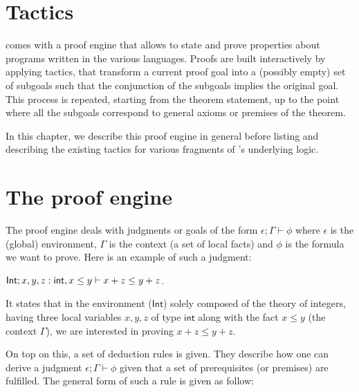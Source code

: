 \section{Tactics}

\EasyCrypt comes with a proof engine that allows to state and prove properties
about programs written in the various languages.
%
Proofs are built interactively by applying tactics, that transform a
current proof goal into a (possibly empty) set of subgoals such that the
conjunction of the subgoals implies the original goal.
%
This process is repeated, starting from the theorem statement, up to the point
where all the subgoals correspond to general axioms or premises of the theorem.

In this chapter, we describe this proof engine in general before listing and
describing the existing tactics for various fragments of \EasyCrypt's
underlying logic.

\section{The proof engine}

The proof engine deals with judgments or goals of the form
$\epsilon; \Gamma \vdash \phi$ where $\epsilon$ is the (global) environment,
$\Gamma$ is the context (a set of local facts) and $\phi$ is the
formula we want to prove. Here is an example of such a judgment:

\begin{center}
$\mathsf{Int}; x, y , z: \tint, x \le y \vdash x + z \le y + z$.
\end{center}

It states that in the environment ($\mathsf{Int}$) solely composed of the
theory of integers, having three local variables $x, y, z$ of type
$\mathsf{int}$ along with the fact $x \le y$ (the context $\Gamma$), we are
interested in proving $x + z \le y + z$.

\medskip

On top on this, a set of deduction rules is given. They describe how one can
derive a judgment $\epsilon; \Gamma \vdash \phi$ given that a set of prerequisites
(or premises) are fulfilled. The general form of such a rule is given
as follow:

\begin{mathpar}
\end{mathpar}

